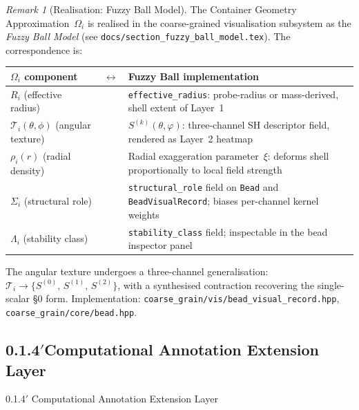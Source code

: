 \documentclass[11pt, a4paper, oneside]{article}
\theoremstyle{definition}
\theoremstyle{remark}
\newtheorem{remark}[postulate]{Remark}
\begin{document}
\begin{remark}[Realisation: Fuzzy Ball Model]
\label{rem:fuzzy-ball}
The Container Geometry Approximation~$\Omega_i$ is realised in the
coarse-grained visualisation subsystem as the \emph{Fuzzy Ball Model}
(see \texttt{docs/section\_fuzzy\_ball\_model.tex}).  The
correspondence is:
%
\begin{center}
\renewcommand{\arraystretch}{1.3}
\begin{tabularx}{\linewidth}{l c >{\raggedright\arraybackslash}X}
  \toprule
  $\Omega_i$ component
    & $\longleftrightarrow$
    & Fuzzy Ball implementation \\
  \midrule
  $R_i$ (effective radius)
    & & \texttt{effective\_radius}: probe-radius or mass-derived,
        shell extent of Layer~1 \\
  $\mathcal{T}_i(\theta,\phi)$ (angular texture)
    & & $S^{(k)}(\theta,\varphi)$: three-channel SH descriptor
        field, rendered as Layer~2 heatmap \\
  $\rho_i(r)$ (radial density)
    & & Radial exaggeration parameter~$\xi$: deforms shell
        proportionally to local field strength \\
  $\Sigma_i$ (structural role)
    & & \texttt{structural\_role} field on \texttt{Bead} and
        \texttt{BeadVisualRecord}; biases per-channel kernel
        weights \\
  $\Lambda_i$ (stability class)
    & & \texttt{stability\_class} field; inspectable in the
        bead inspector panel \\
  \bottomrule
\end{tabularx}
\end{center}
%
The angular texture undergoes a three-channel generalisation:
$\mathcal{T}_i \to \{S^{(0)},\, S^{(1)},\, S^{(2)}\}$, with a
synthesised contraction recovering the single-scalar §0 form.
Implementation: \texttt{coarse\_grain/vis/bead\_visual\_record.hpp},
\texttt{coarse\_grain/core/bead.hpp}.
\end{remark}



\bigskip
\subsection*{0.1.4$'$\quad Computational Annotation Extension Layer}
%
  {0.1.4$'$ Computational Annotation Extension Layer}
\label{sec:comp-annotation}
\end{document}

